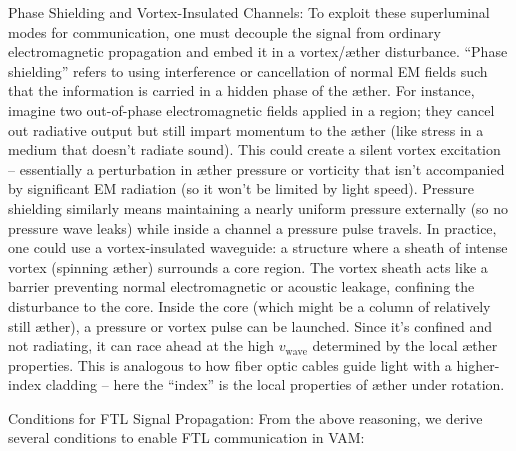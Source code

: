 Phase Shielding and Vortex-Insulated Channels: To exploit these superluminal modes for communication, one must decouple the signal from ordinary electromagnetic propagation and embed it in a vortex/æther disturbance. “Phase shielding” refers to using interference or cancellation of normal EM fields such that the information is carried in a hidden phase of the æther. For instance, imagine two out-of-phase electromagnetic fields applied in a region; they cancel out radiative output but still impart momentum to the æther (like stress in a medium that doesn’t radiate sound). This could create a silent vortex excitation – essentially a perturbation in æther pressure or vorticity that isn’t accompanied by significant EM radiation (so it won’t be limited by light speed). Pressure shielding similarly means maintaining a nearly uniform pressure externally (so no pressure wave leaks) while inside a channel a pressure pulse travels. In practice, one could use a vortex-insulated waveguide: a structure where a sheath of intense vortex (spinning æther) surrounds a core region. The vortex sheath acts like a barrier preventing normal electromagnetic or acoustic leakage, confining the disturbance to the core. Inside the core (which might be a column of relatively still æther), a pressure or vortex pulse can be launched. Since it’s confined and not radiating, it can race ahead at the high $v_\text{wave}$ determined by the local æther properties. This is analogous to how fiber optic cables guide light with a higher-index cladding – here the “index” is the local properties of æther under rotation.


Conditions for FTL Signal Propagation: From the above reasoning, we derive several conditions to enable FTL communication in VAM:


